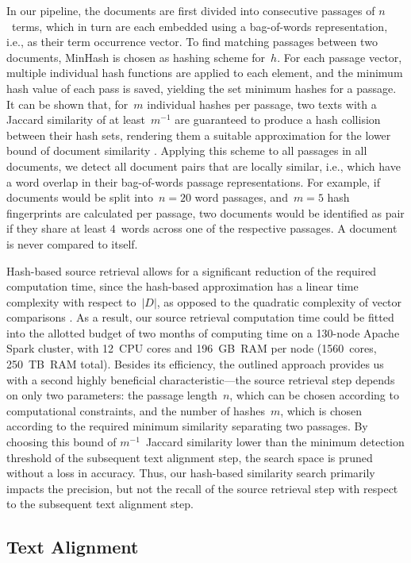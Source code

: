 In our pipeline, the documents are first divided into consecutive passages of $n$~terms, which in turn are each embedded using a bag-of-words representation, i.e., as their term occurrence vector. To find matching passages between two documents, MinHash \cite{broder:97} is chosen as hashing scheme for~$h$. For each passage vector, multiple individual hash functions are applied to each element, and the minimum hash value of each pass is saved, yielding the set minimum hashes for a passage. It can be shown that, for~$m$ individual hashes per passage, two texts with a Jaccard similarity of at least~$m^{-1}$ are guaranteed to produce a hash collision between their hash sets, rendering them a suitable approximation for the lower bound of document similarity \cite{broder:97}. Applying this scheme to all passages in all documents, we detect all document pairs that are locally similar, i.e., which have a word overlap in their bag-of-words passage representations. For example, if documents would be split into~$n=20$ word passages, and~$m=5$ hash fingerprints are calculated per passage, two documents would be identified as pair if they share at least $4$~words across one of the respective passages. A document is never compared to itself.

Hash-based source retrieval allows for a significant reduction of the required computation time, since the hash-based approximation has a linear time complexity with respect to~$|D|$, as opposed to the quadratic complexity of vector comparisons \cite{stein:2019c}. As a result, our source retrieval computation time could be fitted into the allotted budget of two months of computing time on a 130-node Apache Spark cluster, with 12~CPU cores and 196~GB~RAM per node (1560~cores, 250~TB~RAM total). Besides its efficiency, the outlined approach provides us with a second highly beneficial characteristic---the source retrieval step depends on only two parameters: the passage length~$n$, which can be chosen according to computational constraints, and the number of hashes~$m$, which is chosen according to the required minimum similarity separating two passages. By choosing this bound of $m^{-1}$~Jaccard similarity lower than the minimum detection threshold of the subsequent text alignment step, the search space is pruned without a loss in accuracy. Thus, our hash-based similarity search primarily impacts the precision, but not the recall of the source retrieval step with respect to the subsequent text alignment step.


\subsection*{Text Alignment}\label{sub:alignment}


